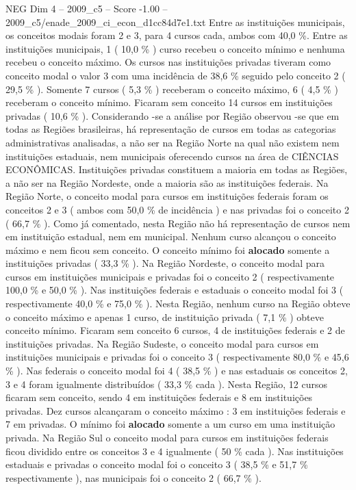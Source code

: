 \begin{textsample}{NEG Dim 4 – 2009\_c5 – Score -1.00 – 2009\_c5/enade\_2009\_ci\_econ\_d1cc84d7e1.txt}
Entre as instituições municipais, os conceitos modais foram 2 e 3, para 4 cursos cada, ambos com 40,0 \%.
Entre as instituições municipais, 1 ( 10,0 \% ) curso recebeu o conceito mínimo e nenhuma recebeu o conceito máximo.
Os cursos nas instituições privadas tiveram como conceito modal o valor 3 com uma incidência de 38,6 \% seguido pelo conceito 2 ( 29,5 \% ).
Somente 7 cursos ( 5,3 \% ) receberam o conceito máximo, 6 ( 4,5 \% ) receberam o conceito mínimo.
Ficaram sem conceito 14 cursos em instituições privadas ( 10,6 \% ).
Considerando -se a análise por Região observou -se que em todas as Regiões brasileiras, há representação de cursos em todas as categorias administrativas analisadas, a não ser na Região Norte na qual não existem nem instituições estaduais, nem municipais oferecendo cursos na área de CIÊNCIAS ECONÔMICAS.
Instituições privadas constituem a maioria em todas as Regiões, a não ser na Região Nordeste, onde a maioria são as instituições federais.
Na Região Norte, o conceito modal para cursos em instituições federais foram os conceitos 2 e 3 ( ambos com 50,0 \% de incidência ) e nas privadas foi o conceito 2 ( 66,7 \% ).
Como já comentado, nesta Região não há representação de cursos nem em instituição estadual, nem em municipal.
Nenhum curso alcançou o conceito máximo e nem ficou sem conceito.
O conceito mínimo foi \textbf{alocado} somente a instituições privadas ( 33,3 \% ).
Na Região Nordeste, o conceito modal para cursos em instituições municipais e privadas foi o conceito 2 ( respectivamente 100,0 \% e 50,0 \% ).
Nas instituições federais e estaduais o conceito modal foi 3 ( respectivamente 40,0 \% e 75,0 \% ).
Nesta Região, nenhum curso na Região obteve o conceito máximo e apenas 1 curso, de instituição privada ( 7,1 \% ) obteve conceito mínimo.
Ficaram sem conceito 6 cursos, 4 de instituições federais e 2 de instituições privadas.
Na Região Sudeste, o conceito modal para cursos em instituições municipais e privadas foi o conceito 3 ( respectivamente 80,0 \% e 45,6 \% ).
Nas federais o conceito modal foi 4 ( 38,5 \% ) e nas estaduais os conceitos 2, 3 e 4 foram igualmente distribuídos ( 33,3 \% cada ).
Nesta Região, 12 cursos ficaram sem conceito, sendo 4 em instituições federais e 8 em instituições privadas.
Dez cursos alcançaram o conceito máximo : 3 em instituições federais e 7 em privadas.
O mínimo foi \textbf{alocado} somente a um curso em uma instituição privada.
Na Região Sul o conceito modal para cursos em instituições federais ficou dividido entre os conceitos 3 e 4 igualmente ( 50 \% cada ).
Nas instituições estaduais e privadas o conceito modal foi o conceito 3 ( 38,5 \% e 51,7 \% respectivamente ), nas municipais foi o conceito 2 ( 66,7 \% ).

\end{textsample}
